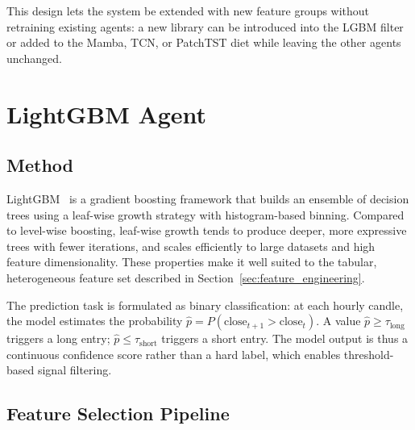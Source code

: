This design lets the system be extended with new feature groups without retraining existing agents: a new library can be introduced into the LGBM filter or added to the Mamba, TCN, or PatchTST diet while leaving the other agents unchanged.

\section{LightGBM Agent}
\label{sec:lgbm_agent}

\subsection{Method}

LightGBM~\cite{ke2017lightgbm} is a gradient boosting framework that builds an ensemble of decision trees using a leaf-wise growth strategy with histogram-based binning. Compared to level-wise boosting, leaf-wise growth tends to produce deeper, more expressive trees with fewer iterations, and scales efficiently to large datasets and high feature dimensionality. These properties make it well suited to the tabular, heterogeneous feature set described in Section~\ref{sec:feature_engineering}.


The prediction task is formulated as binary classification: at each hourly candle, the model estimates the probability $\hat{p} = P(\text{close}_{t+1} > \text{close}_t)$. A value $\hat{p} \geq \tau_{\text{long}}$ triggers a long entry; $\hat{p} \leq \tau_{\text{short}}$ triggers a short entry. The model output is thus a continuous confidence score rather than a hard label, which enables threshold-based signal filtering.

\subsection{Feature Selection Pipeline}
\label{sec:lgbm_feature_selection}

